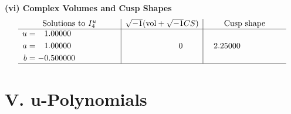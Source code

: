 \documentclass[1p]{elsarticle_modified}
\theoremstyle{definition}
\newcommand{\I}{\sqrt{-1}}
\begin{document}
\newpage\flushleft \textbf{(vi) Complex Volumes and Cusp Shapes}
$$\begin{array}{c|c|c}  
\text{Solutions to }I^u_{4}& \I (\text{vol} + \sqrt{-1}CS) & \text{Cusp shape}\\
 \hline 
\begin{aligned}
u &= \phantom{-}1.00000\phantom{ +0.000000I} \\
a &= \phantom{-}1.00000\phantom{ +0.000000I} \\
b &= -0.500000\phantom{ +0.000000I}\end{aligned}
 & \phantom{-0.000000 } 0 & \phantom{-}2.25000\phantom{ +0.000000I}\\
 \hline 
 \end{array}$$\newpage
\newpage\renewcommand{\arraystretch}{1}
\centering \section*{ V. u-Polynomials}
\end{document}
